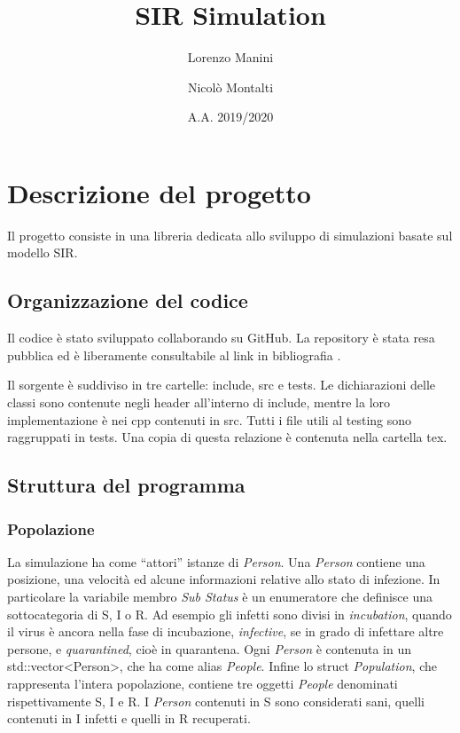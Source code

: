 \documentclass[a4paper,10pt,twocolumn]{article}
\begin{document}
\title{SIR Simulation}
\author{Lorenzo Manini \and Nicolò Montalti}
\date{A.A. 2019/2020}

\maketitle

\section{Descrizione del progetto}
Il progetto consiste in una libreria dedicata allo sviluppo di simulazioni basate sul modello SIR.

\subsection*{Organizzazione del codice}
Il codice è stato sviluppato collaborando su GitHub. La repository è stata resa pubblica ed è liberamente consultabile al link in bibliografia \cite{bib:GitHub}.

Il sorgente è suddiviso in tre cartelle: include, src e tests. Le dichiarazioni delle classi sono contenute negli header all'interno di include, mentre la loro implementazione è nei cpp contenuti in src. Tutti i file utili al testing sono raggruppati in tests. Una copia di questa relazione è contenuta nella cartella tex.

\subsection*{Struttura del programma}
\subsubsection*{Popolazione}
La simulazione ha come “attori” istanze di \emph{Person}. Una \emph{Person} contiene una posizione, una velocità ed alcune informazioni relative allo stato di infezione. In particolare la variabile membro \emph{Sub Status} è un enumeratore che definisce una sottocategoria di S, I o R. Ad esempio gli infetti sono divisi in \emph{incubation}, quando il virus è ancora nella fase di incubazione, \emph{infective}, se in grado di infettare altre persone, e \emph{quarantined}, cioè in quarantena. Ogni \emph{Person} è contenuta in un std::vector<Person>, che ha come alias \emph{People}. Infine lo struct \emph{Population}, che rappresenta l’intera popolazione, contiene tre oggetti \emph{People} denominati rispettivamente S, I e R. I \emph{Person} contenuti in S sono considerati sani, quelli contenuti in I infetti e quelli in R recuperati.
\end{document}
